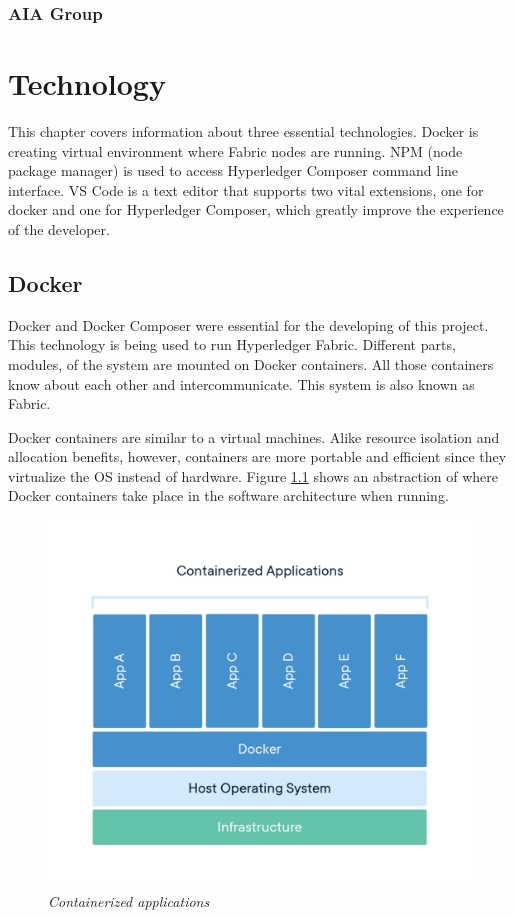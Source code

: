 \documentclass[a4paper,11pt]{report}
\begin{document}
\subsection{AIA Group}


\chapter{Technology}            
\label{technical}

This chapter covers information about three essential technologies. Docker is creating virtual environment where Fabric nodes are running. NPM (node package manager) is used to access Hyperledger Composer command line interface. VS Code is a text editor that supports two vital extensions, one for docker and one for Hyperledger Composer, which greatly improve the experience of the developer. 

\section{Docker}
\label{docker}
Docker and Docker Composer were essential for the developing of this project. This technology is being used to run Hyperledger Fabric. Different parts, modules, of the system are mounted on Docker containers. All those containers know about each other and intercommunicate. This system is also known as Fabric.

	Docker containers are similar to a virtual machines. Alike resource isolation and allocation benefits, however, containers are more portable and efficient since they virtualize the OS instead of hardware.\cite{dockerContainer} Figure \ref{dockerEnvironment} shows an abstraction of where Docker containers take place in the software architecture when running.

\begin{figure}[h]
\centering
  \includegraphics[width = 16cm]{container-what-is-container.png}
  \caption{\textit{Containerized applications \cite{dockerContainer}}}
  \label{dockerEnvironment}
\end{figure}
\end{document}
